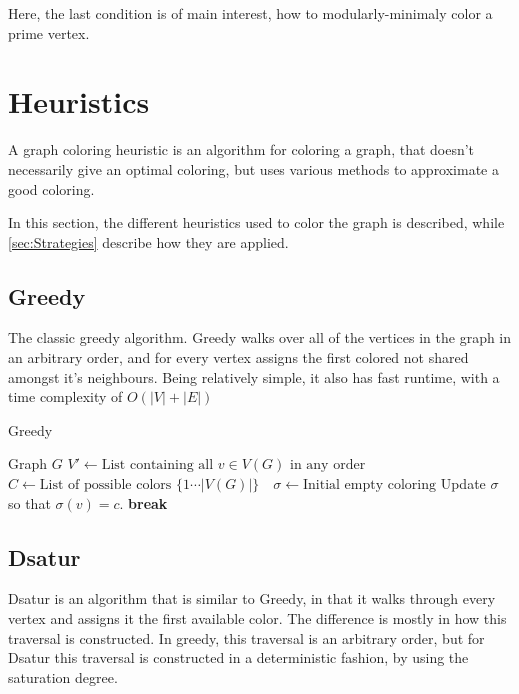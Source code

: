 \documentclass{amsart}
\newcommand{\algorithmicbreak}{\textbf{break}}
\newcommand{\BREAK}{\STATE \algorithmicbreak}
\begin{document}
Here, the last condition is of main interest, how to modularly-minimaly 
color a prime vertex.

\section{Heuristics}
\label{sec:Heuristics}

A graph coloring heuristic is an algorithm for coloring a graph, that doesn't
necessarily give an optimal coloring, but uses various methods to approximate a
good coloring.


In this section, the different heuristics used to color the graph is described,
while \autoref{sec:Strategies} describe how they are applied.
\subsection{Greedy}
The classic greedy algorithm. Greedy walks over all of the vertices in the graph
in an arbitrary order, and for every vertex assigns the first colored not shared
amongst it's neighbours. Being relatively simple, it also has fast runtime, with
a time complexity of $O(|V|+|E|)$ \cite{Constructive}

\begin{algorithm}[H]
  \caption{Greedy}
  \label{alg:greedy}
  \begin{algorithmic}[1]
    \REQUIRE Graph $G$
      \STATE $V' \leftarrow \text{List containing all $v \in V(G)$ in any order}$
      \STATE $C \leftarrow \text{List of possible colors $\{1 \cdots |V(G)| \}$ }$
      \STATE $\sigma \leftarrow \text{Initial empty coloring}$
                \STATE Update $\sigma$ so that $\sigma(v) = c$.
                \BREAK
            \ENDIF
        \ENDFOR
    \ENDFOR
  \end{algorithmic}
\end{algorithm}
\subsection{Dsatur}

Dsatur is an algorithm that is similar to Greedy, in that it walks through every
vertex and assigns it the first available color. The difference is mostly in
how this traversal is constructed. In greedy, this traversal is an arbitrary
order, but for Dsatur this traversal is constructed in a deterministic fashion,
by using the saturation degree.
\end{document}
